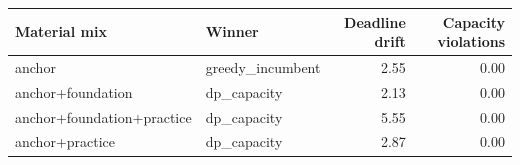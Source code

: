 \begin{tabular}{llrr}
\toprule
Material mix & Winner & Deadline drift & Capacity violations \\
\midrule
anchor & greedy\_incumbent & 2.55 & 0.00 \\
anchor+foundation & dp\_capacity & 2.13 & 0.00 \\
anchor+foundation+practice & dp\_capacity & 5.55 & 0.00 \\
anchor+practice & dp\_capacity & 2.87 & 0.00 \\
\bottomrule
\end{tabular}
